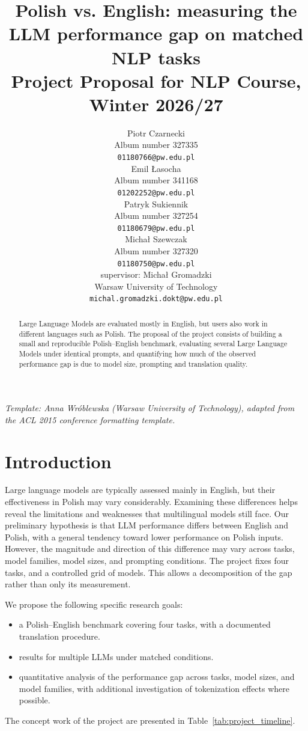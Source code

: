 \documentclass[11pt]{article}
\title{Polish vs. English: measuring the LLM performance gap on matched NLP tasks\\Project Proposal for NLP Course, Winter 2026/27}
\author{Piotr Czarnecki \\
  Album number 327335 \\
  {\tt 01180766@pw.edu.pl} \\ \And
  Emil Łasocha \\
  Album number 341168 \\
  {\tt 01202252@pw.edu.pl} \\ \And
  Patryk Sukiennik \\
  Album number 327254\\
  {\tt 01180679@pw.edu.pl} \\ \AND
  Michał Szewczak \\
  Album number 327320 \\
  {\tt 01180750@pw.edu.pl} \\ \And
  supervisor: Michał Gromadzki\\
  Warsaw University of Technology \\
  {\tt michal.gromadzki.dokt@pw.edu.pl}}
\date{}
\begin{document}
\maketitle

{\small\em Template: Anna Wróblewska (Warsaw University of Technology), adapted from the ACL 2015 conference formatting template.}
\vspace{4pt}

\begin{abstract}
  Large Language Models are evaluated mostly in English, but users also work in different languages such as Polish.
  The proposal of the project consists of building a small and reproducible Polish--English benchmark, evaluating several Large Language Models under identical prompts, and quantifying how much of the observed performance gap is due to model size, prompting and translation quality.
\end{abstract}

\section{Introduction}
Large language models are typically assessed mainly in English, but their effectiveness in Polish may vary considerably. Examining these differences helps reveal the limitations and weaknesses that multilingual models still face. Our preliminary hypothesis is that LLM performance differs
between English and Polish, with a general tendency toward
lower performance on Polish inputs. However, the magnitude
and direction of this difference may vary across tasks, model
families, model sizes, and prompting conditions.
The project fixes four tasks, and a controlled grid of models. This allows a decomposition of the gap rather than only its measurement.

We propose the following specific research goals:
\begin{itemize}
  \item a Polish--English benchmark covering four tasks, with a documented translation procedure.
  \item results for multiple LLMs under matched conditions.
  \item quantitative analysis of the performance gap across
tasks, model sizes, and model families,
with additional investigation of tokenization effects where possible.
\end{itemize}

The concept work of the project are presented in Table~\ref{tab:project_timeline}.
\end{document}

